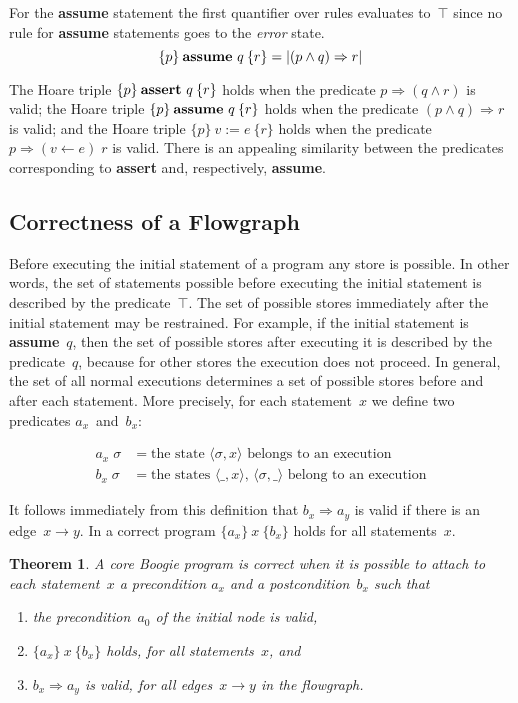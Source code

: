 \documentclass[a4paper]{article}
\newcommand{\hoare}[3]{\{#1\}\>\text{#2}\>\{#3\}}
\newcommand{\limp}{\Rightarrow}
\newcommand{\tru}{\top}
\theoremstyle{slanted}
\newtheorem{theorem}{Theorem}
\theoremstyle{definition}
\theoremstyle{remark}
\begin{document}
For the \textbf{assume}
statement the first quantifier over rules evaluates to~$\tru$
since no rule for \textbf{assume} statements goes to the
\textit{error} state.
\begin{equation}
\hoare{p}{\textbf{assume}~$q$}{r} = |(p\land q)\limp r|
\end{equation}

The Hoare triple $\hoare{p}{\textbf{assert}~$q$}{r}$ holds
when the predicate $p\limp(q\land r)$ is valid; the Hoare
triple $\hoare{p}{\textbf{assume}~$q$}{r}$ holds when the
predicate $(p\land q)\limp r$ is valid; and the Hoare triple
$\hoare{p}{$v:=e$}{r}$ holds when the predicate $p\limp(v\gets
e)\;r$ is valid. There is an appealing similarity between the
predicates corresponding to \textbf{assert} and, respectively,
\textbf{assume}.

\subsection{Correctness of a Flowgraph}

Before executing the initial statement of a program any store
is possible. In other words, the set of statements possible
before executing the initial statement is described by the
predicate~$\tru$. The set of possible stores immediately
after the initial statement may be restrained. For example,
if the initial statement is \textbf{assume}~$q$, then the set
of possible stores after executing it is described by the
predicate~$q$, because for other stores the execution does not
proceed. In general, the set of all normal executions determines
a set of possible stores before and after each statement. More
precisely, for each statement~$x$ we define two predicates
$a_x$~and~$b_x$:

\begin{align}
a_x\;\sigma &= \text{the state $\langle\sigma,x\rangle$ belongs to an execution}\\
b_x\;\sigma &= \text{the states $\langle\_,x\rangle$, $\langle\sigma,\_\rangle$ belong to an execution}
\end{align}

It follows immediately from this definition that $b_x\limp a_y$
is valid if there is an edge~$x\to y$. In a correct program
$\hoare{a_x}{$x$}{b_x}$ holds for all statements~$x$.

\begin{theorem}
A core Boogie program is correct when it is possible to attach to
each statement~$x$ a precondition $a_x$ and a postcondition~$b_x$
such that
\begin{enumerate}
\item the precondition~$a_0$ of the initial node is valid,
\item $\hoare{a_x}{$x$}{b_x}$ holds, for all statements~$x$, and
\item $b_x\limp a_y$ is valid, for all edges~$x\to y$
  in the flowgraph.
\end{enumerate}
\label{th:correctness}
\end{theorem}
\end{document}
